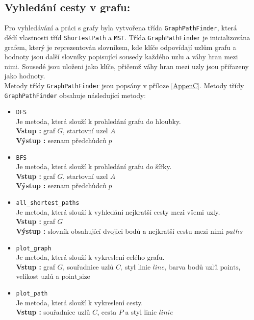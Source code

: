 \subsection{Vyhledání cesty v grafu:}
Pro vyhledávání a práci s grafy byla vytvořena třída \texttt{GraphPathFinder}, která dědí vlastnosti tříd \texttt{ShortestPath} a \texttt{MST}. Třída \texttt{GraphPathFinder} je inicializována grafem, který je reprezentován slovníkem, kde klíče odpovídají uzlům grafu a hodnoty jsou další slovníky popisující sousedy každého uzlu a váhy hran mezi nimi. Sousedé jsou uloženi jako klíče, přičemž váhy hran mezi uzly jsou přiřazeny jako hodnoty.\\
Metody třídy \texttt{GraphPathFinder} jsou popsány v příloze \ref{AppenC}. Metody třídy \texttt{GraphPathFinder} obsahuje následující metody:
\begin{itemize}
    \item \texttt{DFS}\\
    Je metoda, která slouží k prohledání grafu do hloubky.\\
    \textbf{Vstup : } graf $G$, startovní uzel $A$\\
    \textbf{Výstup : } seznam předchůdců $p$
    
    \item \texttt{BFS}\\
    Je metoda, která slouží k prohledání grafu do šířky.\\
    \textbf{Vstup : } graf $G$, startovní uzel $A$\\
    \textbf{Výstup : } seznam předchůdců $p$
    
    \item \texttt{all\_shortest\_paths}\\
    Je metoda, která slouží k vyhledání nejkratší cesty mezi všemi uzly.\\
    \textbf{Vstup : } graf $G$\\
    \textbf{Výstup : } slovník obsahující dvojici bodů a nejkratší cestu mezi nimi $paths$
    
    \item \texttt{plot\_graph}\\
    Je metoda, která slouží k vykreslení celého grafu.\\
    \textbf{Vstup : } graf $G$, souřadnice uzlů $C$, styl linie $line$, barva bodů uzlů $\text{points}$, velikost uzlů a $\text{point\_size}$
    
    \item \texttt{plot\_path}\\
    Je metoda, která slouží k vykreslení cesty.\\
    \textbf{Vstup : } souřadnice uzlů $C$, cesta $P$ a styl linie $linie$
    

\end{itemize}
